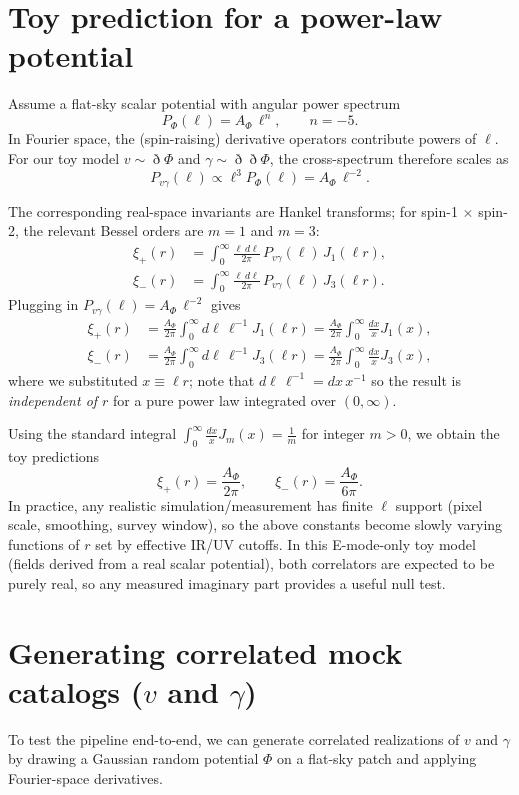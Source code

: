 \documentclass[11pt]{article}
\begin{document}
\section{Toy prediction for a power-law potential}
Assume a flat-sky scalar potential with angular power spectrum
\[
  P_\Phi(\ell) = A_\Phi\,\ell^{n},\qquad n=-5.
\]
In Fourier space, the (spin-raising) derivative operators contribute powers of $\ell$.
For our toy model $v\sim\eth\Phi$ and $\gamma\sim\eth\eth\Phi$, the cross-spectrum therefore scales as
\[
  P_{v\gamma}(\ell) \propto \ell^{3} P_\Phi(\ell) = A_\Phi\,\ell^{-2}.
\]

The corresponding real-space invariants are Hankel transforms; for spin-1 $\times$ spin-2, the relevant Bessel orders are $m=1$ and $m=3$:
\begin{align}
  \xi_+(r) &= \int_0^\infty \frac{\ell\,d\ell}{2\pi}\,P_{v\gamma}(\ell)\,J_1(\ell r),\\
  \xi_-(r) &= \int_0^\infty \frac{\ell\,d\ell}{2\pi}\,P_{v\gamma}(\ell)\,J_3(\ell r).
\end{align}
Plugging in $P_{v\gamma}(\ell)=A_\Phi\,\ell^{-2}$ gives
\begin{align}
  \xi_+(r)
  &=\frac{A_\Phi}{2\pi}\int_0^\infty d\ell\,\ell^{-1}J_1(\ell r)
   =\frac{A_\Phi}{2\pi}\int_0^\infty \frac{dx}{x}J_1(x),\\
  \xi_-(r)
  &=\frac{A_\Phi}{2\pi}\int_0^\infty d\ell\,\ell^{-1}J_3(\ell r)
   =\frac{A_\Phi}{2\pi}\int_0^\infty \frac{dx}{x}J_3(x),
\end{align}
where we substituted $x\equiv \ell r$; note that $d\ell\,\ell^{-1}=dx\,x^{-1}$ so the result is \emph{independent of $r$} for a pure power law integrated over $(0,\infty)$.

Using the standard integral $\int_0^\infty \frac{dx}{x}J_m(x)=\frac{1}{m}$ for integer $m>0$, we obtain the toy predictions
\[
  \boxed{\ \xi_+(r)=\frac{A_\Phi}{2\pi},\qquad
  \xi_-(r)=\frac{A_\Phi}{6\pi}.\ }
\]
In practice, any realistic simulation/measurement has finite $\ell$ support (pixel scale, smoothing, survey window), so the above constants become slowly varying functions of $r$ set by effective IR/UV cutoffs.
In this E-mode-only toy model (fields derived from a real scalar potential), both correlators are expected to be purely real, so any measured imaginary part provides a useful null test.

\section{Generating correlated mock catalogs ($v$ and $\gamma$)}
To test the pipeline end-to-end, we can generate correlated realizations of $v$ and $\gamma$ by drawing a Gaussian random potential $\Phi$ on a flat-sky patch and applying Fourier-space derivatives.
\end{document}
